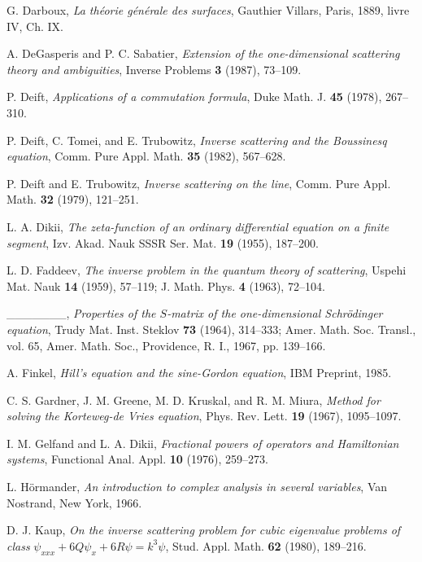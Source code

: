 \documentclass{surv-l}
\theoremstyle{plain}
\theoremstyle{definition}
\numberwithin{equation}{chapter}
\begin{document}
\begin{thebibliography}{AKNS}
 G. Darboux, \emph{La th\'{e}orie g\'{e}n\'{e}rale des surfaces}, Gauthier Villars, Paris, 1889, livre IV, Ch. IX.

 A. DeGasperis and P. C. Sabatier, \emph{Extension of the one-dimensional scattering theory and ambiguities}, Inverse Problems \textbf{3} (1987), 73--109.

 P. Deift, \emph{Applications of a commutation formula}, Duke Math. J. \textbf{45} (1978), 267--310.

 P. Deift, C. Tomei, and E. Trubowitz, \emph{Inverse scattering and the Boussinesq equation}, Comm. Pure Appl. Math. \textbf{35} (1982), 567--628.

 P. Deift and E. Trubowitz, \emph{Inverse scattering on the line}, Comm. Pure Appl. Math. \textbf{32} (1979), 121--251.

 L. A. Dikii, \emph{The zeta-function of an ordinary differential equation on a finite segment}, Izv. Akad. Nauk SSSR Ser. Mat. \textbf{19} (1955), 187--200.

 L. D. Faddeev, \emph{The inverse problem in the quantum theory of scattering}, Uspehi Mat. Nauk \textbf{14} (1959), 57--119; J. Math. Phys. \textbf{4} (1963), 72--104.

 \_\_\_\_\_\_\_, \emph{Properties of the $S$-matrix of the one-dimensional Schr\"{o}dinger equation}, Trudy Mat. Inst. Steklov \textbf{73} (1964), 314--333; Amer. Math. Soc. Transl., vol. 65, Amer. Math. Soc., Providence, R. I., 1967, pp. 139--166.

 A. Finkel, \emph{Hill's equation and the sine-Gordon equation}, IBM Preprint, 1985.

 C. S. Gardner, J. M. Greene, M. D. Kruskal, and R. M. Miura, \emph{Method for solving the Korteweg-de Vries equation}, Phys. Rev. Lett. \textbf{19} (1967), 1095--1097.

 I. M. Gelfand and L. A. Dikii, \emph{Fractional powers of operators and Hamiltonian systems}, Functional Anal. Appl. \textbf{10} (1976), 259--273.

 L. H\"{o}rmander, \emph{An introduction to complex analysis in several variables}, Van Nostrand, New York, 1966.

 D. J. Kaup, \emph{On the inverse scattering problem for cubic eigenvalue problems of class} $\psi_{xxx}+6Q\psi_{x}+6R\psi=k^{3}\psi$, Stud. Appl. Math. \textbf{62} (1980), 189--216.


\end{thebibliography}
\end{document}
